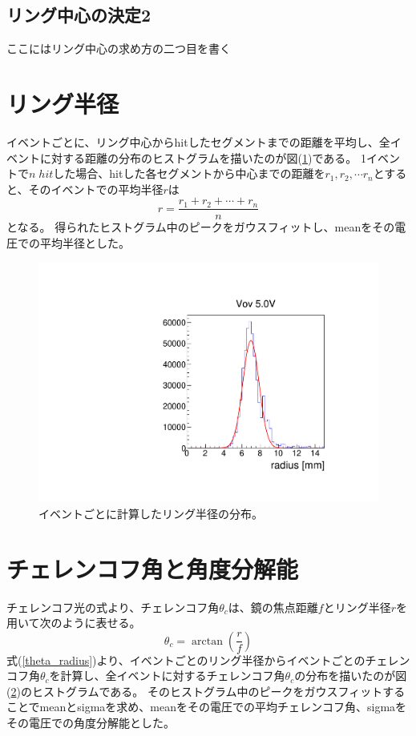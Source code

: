 \documentclass[uplatex, titlepage, dvipdfmx, 12pt, a4paper]{jsreport}
\begin{document}
    \subsection{リング中心の決定2}
      ここにはリング中心の求め方の二つ目を書く
    \section{リング半径}
    イベントごとに、リング中心からhitしたセグメントまでの距離を平均し、全イベントに対する距離の分布のヒストグラムを描いたのが図(\ref{fig:5Vradius})である。
    1イベントで$n\;\si{hit}$した場合、hitした各セグメントから中心までの距離を$r_1, r_2, \cdots r_n$とすると、そのイベントでの平均半径$r$は
    \begin{equation}
      r = \frac{r_1 + r_2 + \cdots + r_n}{n} \nonumber
    \end{equation}
    となる。
    得られたヒストグラム中のピークをガウスフィットし、meanをその電圧での平均半径とした。
    \begin{figure}[hbtp]
      \begin{center} 
        \includegraphics[scale=0.5, clip]{image/radius.pdf}
        \caption{イベントごとに計算したリング半径の分布。} 
        \label{fig:5Vradius} 
      \end{center}
    \end{figure}
    
    
    
    \section{チェレンコフ角と角度分解能}
      チェレンコフ光の式より、チェレンコフ角$\theta_{c}$は、鏡の焦点距離$f$とリング半径$r$を用いて次のように表せる。
      \begin{equation}
        \theta_{c} = \arctan \left(\frac{r}{f} \right)
        \label{theta_radius}
      \end{equation}
      式(\ref{theta_radius})より、イベントごとのリング半径からイベントごとのチェレンコフ角$\theta_{c}$を計算し、全イベントに対するチェレンコフ角$\theta_c$の分布を描いたのが図(\ref{})のヒストグラムである。
      そのヒストグラム中のピークをガウスフィットすることでmeanとsigmaを求め、meanをその電圧での平均チェレンコフ角、sigmaをその電圧での角度分解能とした。
\end{document}
